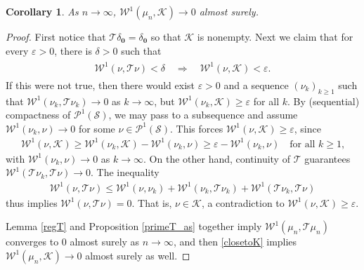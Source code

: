 \documentclass[11pt,reqno]{amsart}
\numberwithin{equation}{section}
\newtheorem{cor}[thm]{Corollary}
\theoremstyle{definition}
\begin{document}
\begin{cor} \label{close_probability}
As $n \to \infty$, ${\mathcal{W}}^1(\mu_n,{\mathcal{K}}) \to 0$ almost surely.
\end{cor}

\begin{proof}
First notice that ${\mathcal{T}}\delta_{{\boldsymbol {0}}} = \delta_{{\boldsymbol {0}}}$ so that ${\mathcal{K}}$ is nonempty.
Next we claim that for every ${\varepsilon} > 0$, there is $\delta > 0$ such that
{\begin{align} \begin{split} {
{\mathcal{W}}^1(\nu,{\mathcal{T}}\nu) < \delta \quad \Rightarrow \quad {\mathcal{W}}^1(\nu,{\mathcal{K}}) < {\varepsilon}. \label{closetoK}
} \end{split} \end{align}}
If this were not true, then there would exist ${\varepsilon} > 0$ and a sequence $(\nu_k)_{k \geq 1}$ such that ${\mathcal{W}}^1(\nu_k,{\mathcal{T}}\nu_k) \to 0$ as $k \to \infty$, but ${\mathcal{W}}^1(\nu_k,{\mathcal{K}}) \geq {\varepsilon}$ for all $k$.
By (sequential) compactness of ${\mathcal{P}}^1({\mathcal{S}})$, we may pass to a subsequence and assume ${\mathcal{W}}^1(\nu_k,\nu) \to 0$ for some $\nu \in {\mathcal{P}}^1({\mathcal{S}})$.  This forces ${\mathcal{W}}^1(\nu,{\mathcal{K}}) \geq {\varepsilon}$, since
{\begin{align*} {
{\mathcal{W}}^1(\nu,{\mathcal{K}}) \geq {\mathcal{W}}^1(\nu_k,{\mathcal{K}}) - {\mathcal{W}}^1(\nu_k,\nu) \geq {\varepsilon} - {\mathcal{W}}^1(\nu_k,\nu) \quad \text{for all $k \geq 1$,}
} \end{align*}}
with ${\mathcal{W}}^1(\nu_k,\nu) \to 0$ as $k \to \infty$.
On the other hand, continuity of ${\mathcal{T}}$ guarantees ${\mathcal{W}}^1({\mathcal{T}}\nu_k,{\mathcal{T}}\nu) \to 0$.
The inequality
{\begin{align*} {
{\mathcal{W}}^1(\nu,{\mathcal{T}}\nu) \leq {\mathcal{W}}^1(\nu,\nu_k) + {\mathcal{W}}^1(\nu_k,{\mathcal{T}}\nu_k) + {\mathcal{W}}^1({\mathcal{T}}\nu_k,{\mathcal{T}}\nu)
} \end{align*}}
thus implies ${\mathcal{W}}^1(\nu,{\mathcal{T}}\nu) = 0$.
That is, $\nu \in {\mathcal{K}}$, a contradiction to ${\mathcal{W}}^1(\nu,{\mathcal{K}}) \geq {\varepsilon}$.

Lemma \ref{regT} and Proposition \ref{primeT_as} together imply ${\mathcal{W}}^1(\mu_n,{\mathcal{T}}\mu_n)$ converges to 0 almost surely as $n \to \infty$, and then
\eqref{closetoK} implies ${\mathcal{W}}^1(\mu_n,{\mathcal{K}}) \to 0$ almost surely as well.
\end{proof}
\end{document}
